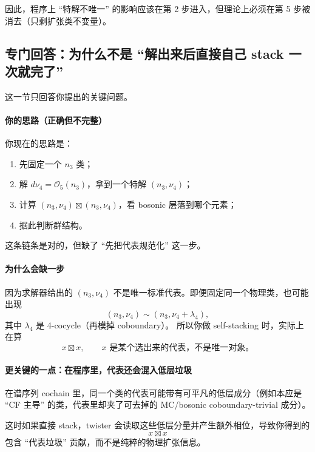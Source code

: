 \documentclass[a4paper,fontset=ubuntu,12pt]{ctexart}
\begin{document}
因此，程序上 ``特解不唯一'' 的影响应该在第 2 步进入，但理论上必须在第 5 步被消去（只剩扩张类不变量）。

\subsection{专门回答：为什么不是 ``解出来后直接自己 stack 一次就完了''}
\label{sec:why-not-only-self-stack}

这一节只回答你提出的关键问题。

\paragraph{你的思路（正确但不完整）}
你现在的思路是：
\begin{enumerate}
\item 先固定一个 $n_3$ 类；
\item 解 $d\nu_4=\mathcal{O}_5(n_3)$，拿到一个特解 $(n_3,\nu_4)$；
\item 计算 $(n_3,\nu_4)\boxtimes(n_3,\nu_4)$，看 bosonic 层落到哪个元素；
\item 据此判断群结构。
\end{enumerate}
这条链条是对的，但缺了 ``先把代表规范化'' 这一步。

\paragraph{为什么会缺一步}
因为求解器给出的 $(n_3,\nu_4)$ 不是唯一标准代表。即便固定同一个物理类，也可能出现
\begin{equation}
(n_3,\nu_4)\sim (n_3,\nu_4+\lambda_4),
\label{eq:rep-change}
\end{equation}
其中 $\lambda_4$ 是 4-cocycle（再模掉 coboundary）。
所以你做 self-stacking 时，实际上在算
\begin{equation}
x\boxtimes x,\qquad x\text{ 是某个选出来的代表，不是唯一对象。}
\label{eq:self-stack-rep}
\end{equation}

\paragraph{更关键的一点：在程序里，代表还会混入低层垃圾}
在谱序列 cochain 里，同一个类的代表可能带有可平凡的低层成分（例如本应是 ``CF 主导'' 的类，代表里却夹了可去掉的 MC/bosonic coboundary-trivial 成分）。

这时如果直接 stack，twister 会读取这些低层分量并产生额外相位，导致你得到的
\begin{equation}
x\boxtimes x
\label{eq:self-stack-with-garbage}
\end{equation}
包含 ``代表垃圾'' 贡献，而不是纯粹的物理扩张信息。
\end{document}
